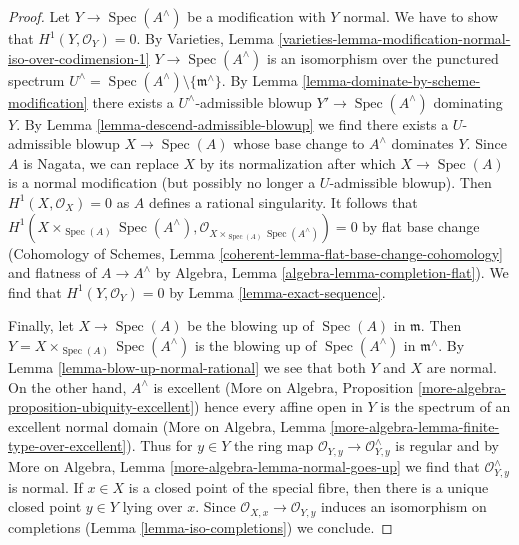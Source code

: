 \documentclass[10pt,a4paper]{amsart}
\theoremstyle{plain}
\theoremstyle{definition}
\theoremstyle{remark}
\numberwithin{equation}{subsection}
\def\Spec{\mathop{\mathrm{Spec}}}
\begin{document}
\begin{proof}
Let $Y \to \Spec(A^\wedge)$ be a modification with $Y$ normal.
We have to show that $H^1(Y, \mathcal{O}_Y) = 0$. By Varieties, Lemma
\ref{varieties-lemma-modification-normal-iso-over-codimension-1}
$Y \to \Spec(A^\wedge)$ is an isomorphism over the punctured
spectrum $U^\wedge = \Spec(A^\wedge) \setminus \{\mathfrak m^\wedge\}$.
By Lemma \ref{lemma-dominate-by-scheme-modification}
there exists a $U^\wedge$-admissible blowup $Y' \to \Spec(A^\wedge)$
dominating $Y$. By Lemma \ref{lemma-descend-admissible-blowup}
we find there exists a $U$-admissible blowup $X \to \Spec(A)$
whose base change to $A^\wedge$ dominates $Y$.
Since $A$ is Nagata, we can replace $X$ by its normalization
after which $X \to \Spec(A)$ is a normal modification (but
possibly no longer a $U$-admissible blowup).
Then $H^1(X, \mathcal{O}_X) = 0$ as $A$ defines a rational
singularity. It follows that
$H^1(X \times_{\Spec(A)} \Spec(A^\wedge),
\mathcal{O}_{X \times_{\Spec(A)} \Spec(A^\wedge)}) = 0$
by flat base change (Cohomology of Schemes, Lemma
\ref{coherent-lemma-flat-base-change-cohomology}
and flatness of $A \to A^\wedge$ by
Algebra, Lemma \ref{algebra-lemma-completion-flat}).
We find that $H^1(Y, \mathcal{O}_Y) = 0$ by
Lemma \ref{lemma-exact-sequence}.

\medskip\noindent
Finally, let $X \to \Spec(A)$ be the blowing up of $\Spec(A)$
in $\mathfrak m$. Then $Y = X \times_{\Spec(A)} \Spec(A^\wedge)$
is the blowing up of $\Spec(A^\wedge)$ in $\mathfrak m^\wedge$.
By Lemma \ref{lemma-blow-up-normal-rational} we see that both $Y$
and $X$ are normal. On the other hand, $A^\wedge$ is excellent
(More on Algebra, Proposition
\ref{more-algebra-proposition-ubiquity-excellent})
hence every affine open in $Y$ is the spectrum of an
excellent normal domain
(More on Algebra, Lemma \ref{more-algebra-lemma-finite-type-over-excellent}).
Thus for $y \in Y$ the ring map
$\mathcal{O}_{Y, y} \to \mathcal{O}_{Y, y}^\wedge$
is regular and by
More on Algebra, Lemma \ref{more-algebra-lemma-normal-goes-up}
we find that $\mathcal{O}_{Y, y}^\wedge$ is normal.
If $x \in X$ is a closed point of the special fibre,
then there is a unique closed point $y \in Y$ lying over $x$.
Since $\mathcal{O}_{X, x} \to \mathcal{O}_{Y, y}$ induces
an isomorphism on completions (Lemma \ref{lemma-iso-completions})
we conclude.
\end{proof}
\end{document}
